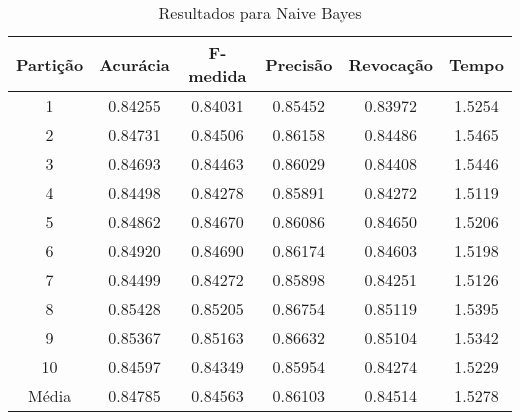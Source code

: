 \begin{table}[h]
\centering
\caption{Resultados para Naive Bayes}
\vspace{0.2cm}
\begin{tabular}{c|c|c|c|c|c}
Partição & Acurácia & F-medida & Precisão & Revocação & Tempo \\
\hline
1  & 0.84255 & 0.84031 & 0.85452 & 0.83972 & 1.5254 \\
2  & 0.84731 & 0.84506 & 0.86158 & 0.84486 & 1.5465 \\
3  & 0.84693 & 0.84463 & 0.86029 & 0.84408 & 1.5446 \\
4  & 0.84498 & 0.84278 & 0.85891 & 0.84272 & 1.5119 \\
5  & 0.84862 & 0.84670 & 0.86086 & 0.84650 & 1.5206 \\
6  & 0.84920 & 0.84690 & 0.86174 & 0.84603 & 1.5198 \\
7  & 0.84499 & 0.84272 & 0.85898 & 0.84251 & 1.5126 \\
8  & 0.85428 & 0.85205 & 0.86754 & 0.85119 & 1.5395 \\
9  & 0.85367 & 0.85163 & 0.86632 & 0.85104 & 1.5342 \\
10 & 0.84597 & 0.84349 & 0.85954 & 0.84274 & 1.5229 \\
\hline
Média & 0.84785 & 0.84563 & 0.86103 & 0.84514 & 1.5278 \\

\end{tabular} 
\label{table:resultadosNB}
\end{table}
